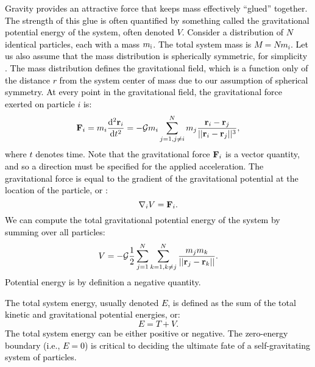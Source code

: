 \documentclass[main.tex]{subfiles}
\begin{document}
\begin{tcolorbox}[sharp corners, colback=blue!30, colframe=blue!80!blue, title=Box \refstepcounter{educhap2}\label{boxchap2:PE}\ref{boxchap2:PE} -- Gravitational Potential Energy]
\par \textcolor{black} {Gravity provides an attractive force that keeps mass effectively ``glued'' together.  The strength of this glue is often quantified by something called the gravitational potential energy of the system, often denoted $V$.  Consider a distribution of $N$ identical particles, each with a mass $m_{\rm i}$.  The total system mass is $M = Nm_i$.  Let us also assume that the mass distribution is spherically symmetric, for simplicity .  The mass distribution defines the gravitational field, which is a function only of the distance $r$ from the system center of mass due to our assumption of spherical symmetry.  At every point in the gravitational field, the gravitational force exerted on particle $i$ is:
\begin{equation}
{\mathbf{F}}_i = m_i \frac{\mathrm{d}^2{{\mathbf{r}}_i}}{\mathrm{d}t^2} = -\mathcal{G} m_i \sum_{j=1,j \ne i}^{N}m_j \frac{{\mathbf{r}}_i - {\mathbf{r}}_j}{||{\mathbf{r}}_i - {\mathbf{r}}_j||^3},
\label{eqn:force}
\end{equation}
where $t$ denotes time.  Note that the gravitational force ${\mathbf{F}}_i$ is a vector quantity, and so a direction must be specified for the applied acceleration.  The gravitational force is equal to the gradient of the gravitational potential at the location of the particle, or :
\begin{equation}
\nabla_i V = {\mathbf{F}}_i.
\end{equation}
We can compute the total gravitational potential energy of the system by summing over all particles:
\begin{equation}
V = -\mathcal{G} \frac{1}{2}\sum_{j=1}^{N}\sum_{k=1, k \ne j}^{N}\frac{m_j m_k }{||{\mathbf{r}}_j - {\mathbf{r}}_k||}.
\end{equation}
Potential energy is by definition a negative quantity.}
\end{tcolorbox}

\begin{tcolorbox}[sharp corners, colback=blue!30, colframe=blue!80!blue, title=Box \refstepcounter{educhap2}\label{boxchap2:en}\ref{boxchap2:en} -- Total Energy]
\par \textcolor{black} {The total system energy, usually denoted $E$, is defined as the sum of the total kinetic and gravitational potential energies, or:
\begin{equation}
E = T + V.
\end{equation}
The total system energy can be either positive or negative.  The zero-energy boundary (i.e., $E = 0$) is critical to deciding the ultimate fate of a self-gravitating system of particles.}  
\end{tcolorbox}
\end{document}
